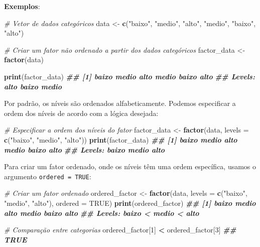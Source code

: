 \documentclass[
]{book}
\newenvironment{Shaded}{\begin{snugshade}}{\end{snugshade}}
\newcommand{\AttributeTok}[1]{\textcolor[rgb]{0.13,0.29,0.53}{#1}}
\newcommand{\CommentTok}[1]{\textcolor[rgb]{0.56,0.35,0.01}{\textit{#1}}}
\newcommand{\ConstantTok}[1]{\textcolor[rgb]{0.56,0.35,0.01}{#1}}
\newcommand{\DecValTok}[1]{\textcolor[rgb]{0.00,0.00,0.81}{#1}}
\newcommand{\DocumentationTok}[1]{\textcolor[rgb]{0.56,0.35,0.01}{\textbf{\textit{#1}}}}
\newcommand{\FunctionTok}[1]{\textcolor[rgb]{0.13,0.29,0.53}{\textbf{#1}}}
\newcommand{\NormalTok}[1]{#1}
\newcommand{\OtherTok}[1]{\textcolor[rgb]{0.56,0.35,0.01}{#1}}
\newcommand{\SpecialCharTok}[1]{\textcolor[rgb]{0.81,0.36,0.00}{\textbf{#1}}}
\newcommand{\StringTok}[1]{\textcolor[rgb]{0.31,0.60,0.02}{#1}}
\begin{document}
\textbf{Exemplos}:

\begin{Shaded}
\begin{Highlighting}[]
\CommentTok{\# Vetor de dados categóricos}
\NormalTok{data }\OtherTok{\textless{}{-}} \FunctionTok{c}\NormalTok{(}\StringTok{"baixo"}\NormalTok{, }\StringTok{"medio"}\NormalTok{, }\StringTok{"alto"}\NormalTok{, }\StringTok{"medio"}\NormalTok{, }\StringTok{"baixo"}\NormalTok{, }\StringTok{"alto"}\NormalTok{)}

\CommentTok{\# Criar um fator não ordenado a partir dos dados categóricos}
\NormalTok{factor\_data }\OtherTok{\textless{}{-}} \FunctionTok{factor}\NormalTok{(data)}

\FunctionTok{print}\NormalTok{(factor\_data)}
\DocumentationTok{\#\# [1] baixo    medio alto   medio baixo    alto}
\DocumentationTok{\#\# Levels: alto baixo medio}
\end{Highlighting}
\end{Shaded}

Por padrão, os níveis são ordenados alfabeticamente. Podemos especificar
a ordem dos níveis de acordo com a lógica desejada:

\begin{Shaded}
\begin{Highlighting}[]
\CommentTok{\# Especificar a ordem dos níveis do fator}
\NormalTok{factor\_data }\OtherTok{\textless{}{-}} \FunctionTok{factor}\NormalTok{(data, }\AttributeTok{levels =} \FunctionTok{c}\NormalTok{(}\StringTok{"baixo"}\NormalTok{, }\StringTok{"medio"}\NormalTok{, }\StringTok{"alto"}\NormalTok{))}
\FunctionTok{print}\NormalTok{(factor\_data)}
\DocumentationTok{\#\# [1] baixo    medio alto   medio baixo    alto}
\DocumentationTok{\#\# Levels: baixo medio alto}
\end{Highlighting}
\end{Shaded}

Para criar um fator ordenado, onde os níveis têm uma ordem específica,
usamos o argumento \texttt{ordered\ =\ TRUE}:

\begin{Shaded}
\begin{Highlighting}[]
\CommentTok{\# Criar um fator ordenado}
\NormalTok{ordered\_factor }\OtherTok{\textless{}{-}} \FunctionTok{factor}\NormalTok{(data, }\AttributeTok{levels =} \FunctionTok{c}\NormalTok{(}\StringTok{"baixo"}\NormalTok{, }\StringTok{"medio"}\NormalTok{, }\StringTok{"alto"}\NormalTok{), }\AttributeTok{ordered =} \ConstantTok{TRUE}\NormalTok{)}
\FunctionTok{print}\NormalTok{(ordered\_factor)}
\DocumentationTok{\#\# [1] baixo    medio alto   medio baixo    alto}
\DocumentationTok{\#\# Levels: baixo \textless{} medio \textless{} alto}

\CommentTok{\# Comparação entre categorias}
\NormalTok{ordered\_factor[}\DecValTok{1}\NormalTok{] }\SpecialCharTok{\textless{}}\NormalTok{ ordered\_factor[}\DecValTok{3}\NormalTok{]}
\DocumentationTok{\#\# TRUE}
\end{Highlighting}
\end{Shaded}
\end{document}
